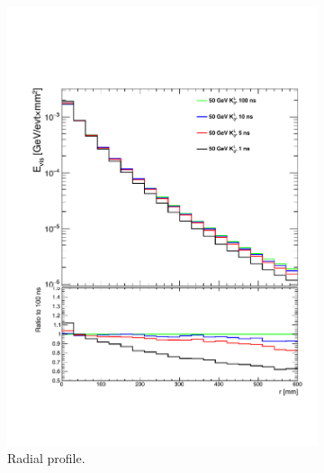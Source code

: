 \begin{figure}[htbp!]
  \centering
  \begin{subfigure}[t]{0.45\textwidth}
    \centering
    \includegraphics[width=1\linewidth]{chap6/fig_TimingILD/NoSmearing/RadialProfileOverlay_noSmearing}
    \caption{Radial profile.} \label{fig:RadialProfNoSmearing}
  \end{subfigure}
  \hfill
  \begin{subfigure}[t]{0.45\textwidth}
    \centering

\end{subfigure}
\end{figure}
